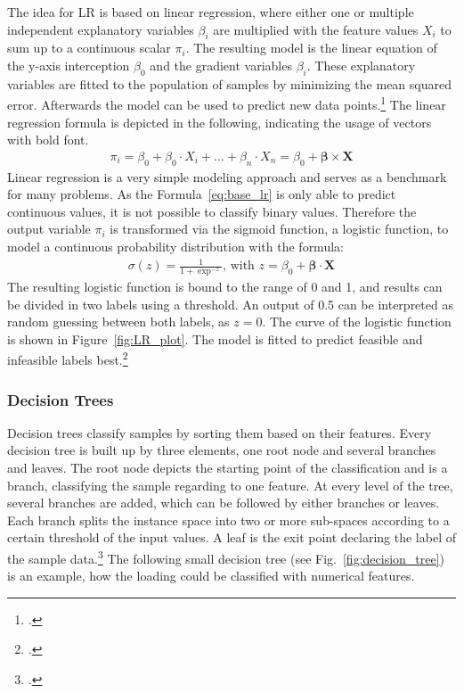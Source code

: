 The idea for \gls{LR} is based on linear regression, where either one or multiple independent explanatory
variables $\beta_i$ are multiplied with the feature values $X_i$ to sum up to a continuous scalar $\pi_i$.
The resulting model is the linear equation of the y-axis interception $\beta_0$
and the gradient variables $\beta_i$.
These explanatory variables are fitted to the population of samples by minimizing the mean squared
error. Afterwards the model can be used to predict new data points.\footcite[cf.][p. 6f]{nasteski_overview_2017}
The linear regression formula is depicted in the following, indicating the usage of vectors with bold font.
\begin{align}
    \pi_i=\beta_0+\beta_0 \cdot X_i+\dots+\beta_n \cdot X_n = \beta_0 + \bm{\beta} \times \bm{X}
    \label{eq:base_lr}
\end{align}
Linear regression is a very simple modeling approach and serves as a benchmark for many problems. As the Formula~\ref{eq:base_lr} is only able to predict continuous
values, it is not possible to classify binary values. Therefore the output variable $\pi_i$ is transformed via the sigmoid function, a logistic function,
to model a continuous probability distribution with the formula:
\begin{align}
    \sigma(z)=\frac{1}{1+\exp^{-z}},\, \text{with } z = \beta_0 + \bm{\beta} \cdot \bm{X}
    \label{eq:logistic_func}
\end{align}
The resulting logistic function is bound to the range of 0 and 1, and results can be divided
in two labels using a threshold. An output of 0.5 can be interpreted as random
guessing between both labels, as $z=0$. The curve of the logistic function is shown in Figure~\ref{fig:LR_plot}.
The model is fitted to predict feasible and infeasible labels best.\footcite[cf.][]{kirasich_random_2018}



\subsubsection{Decision Trees}
Decision trees classify samples by sorting them based on their features. Every decision tree
is built up by three elements, one root node and several branches and leaves. The root node
depicts the starting point of the classification and is a branch, classifying the sample
regarding to one feature. At every level of the tree, several branches are added, which can be followed
by either branches or leaves. Each branch splits the instance space into two or more sub-spaces
according to a certain threshold of the input values. A leaf is the exit point declaring
the label of the sample data.\footcite[cf.][p. 5f]{nasteski_overview_2017}
The following small decision tree (see Fig.~\ref{fig:decision_tree}) is an example,
how the loading could be classified with numerical features.

